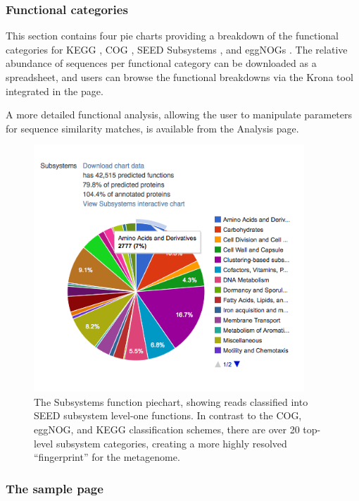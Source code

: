 \documentclass[12pt,fullpage]{report}
\begin{document}
\subsubsection*{Functional categories}

This section contains four pie charts providing a breakdown of the functional categories for KEGG \cite{KEGG}, COG \cite{COG}, \gls{SEED} \gls{Subsystem}s \cite{SUBSYSTEMS}, and eggNOGs \cite{EGGNOG}.
The relative abundance of sequences per functional category can be downloaded as a spreadsheet, and users can browse the functional breakdowns via the Krona tool \cite{KRONA} integrated in the page.

A more detailed functional analysis, allowing the user to manipulate parameters for sequence similarity matches, is available from the Analysis page.

\begin{figure}
\begin{center}
\includegraphics[width=4in]{Images/subsystems-functions-piechart.png}
\end{center}
\caption{
The \gls{Subsystem}s function piechart, showing reads classified into SEED subsystem level-one functions. In contrast to the COG, eggNOG, and KEGG classification schemes, there are over 20 top-level subsystem categories, creating a more highly resolved ``fingerprint'' for the metagenome.
}
\label{fig:subsystems-functions-piechart}
\end{figure}



\subsubsection*{The sample page}
\end{document}
